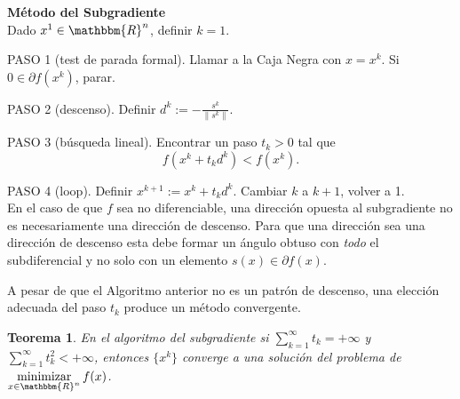 \documentclass[a4paper,12pt]{report}
\newcommand{\la}{\langle}
\newcommand{\ra}{\rangle}
\newcommand{\RR}{\mathbbm{R}}
\newcommand{\Rn}{\RR^n}
\newtheorem{teo}{Teorema}[section]
\begin{document}


\noindent\textbf{M\'etodo del Subgradiente}\\ Dado $x^1\in\Rn$, definir $k=1$.

PASO 1 (test de parada formal). Llamar a la Caja Negra con $x=x^k$. Si \linebreak $0\in\partial f(x^k)$, parar.

PASO 2 (descenso). Definir $d^k:=-\frac{s^k}{\|s^k\|}$.

PASO 3 (b\'usqueda lineal). Encontrar un paso $t_k>0$ tal que $$f(x^k+t_k d^k)<f(x^k).$$

PASO 4 (loop). Definir $x^{k+1}:=x^k+t_k d^k$. Cambiar $k$ a $k+1$, volver a 1.\\

En el caso de que $f$ sea no diferenciable, una direcci\'on opuesta al subgradiente no es necesariamente una direcci\'on de descenso. Para que una direcci\'on sea una direcci\'on de descenso esta debe formar un \'angulo obtuso con {\em todo} el subdiferencial y no solo con un elemento $s(x)\in\partial f(x)$.

A pesar de que el Algoritmo anterior no es un patr\'on de descenso, una elecci\'on adecuada del paso $t_k$ produce un m\'etodo convergente.

\begin{teo}
En el algoritmo del subgradiente si $\displaystyle{\sum_{k=1}^{\infty}t_k=+\infty}$ y $\displaystyle{\sum_{k=1}^{\infty}t_k^2<+\infty}$, entonces $\{x^k\}$ converge a una soluci\'on del problema de $\displaystyle\mathop{\mathrm{minimizar}}_{x\in\Rn}f(x)$.
\end{teo}
\end{document}
